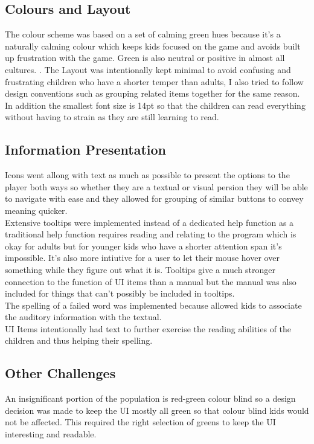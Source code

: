 \documentclass[conference]{IEEEtran}
\begin{document}
	\subsection{Colours and Layout}
		The colour scheme was based on a set of calming green hues because it's a naturally calming colour which keeps kids focused on the game and avoids built up frustration with the game. Green is also neutral or positive in almost all cultures. \cite{Green:Scott-Kemmis}. The Layout was intentionally kept minimal to avoid confusing and frustrating children who have a shorter temper than adults, I also tried to follow design conventions such as grouping related items together for the same reason.\\ In addition the smallest font size is 14pt so that the children can read everything without having to strain as they are still learning to read.
	\subsection{Information Presentation}
		Icons went allong with text as much as possible to present the options to the player both ways so whether they are a textual or visual persion they will be able to navigate with ease and they allowed for grouping of similar buttons to convey meaning quicker.\\
		Extensive tooltips were implemented instead of a dedicated help function as a traditional help function requires reading and relating to the program which is okay for adults but for younger kids who have a shorter attention span it's impossible. It's also more intiutive for a user to let their mouse hover over something while they figure out what it is. Tooltips give a much stronger connection to the function of UI items than a manual but the manual was also included for things that can't possibly be included in tooltips.\\
		The spelling of a failed word was implemented because allowed kids to associate the auditory information with the textual.\\
		UI Items intentionally had text to further exercise the reading abilities of the children and thus helping their spelling.
	\subsection{Other Challenges}
		An insignificant portion of the population is red-green colour blind \cite{colour:blind} so a design decision was made to keep the UI mostly all green so that colour blind kids would not be affected. This required the right selection of greens to keep the UI interesting and readable.
\end{document}
